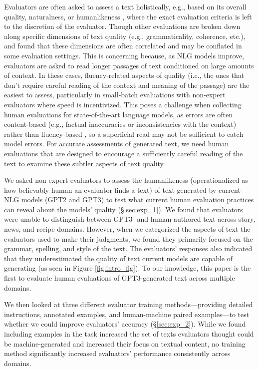 Evaluators are often asked to assess a text holistically, e.g., based on its overall quality, naturalness, or humanlikeness \citep{vanderlee_journal, howcroft-etal-2020-twenty}, 
where the exact evaluation criteria is left to the discretion of the evaluator.
Though other evaluations are broken down along specific dimensions of text quality (e.g., grammaticality, coherence, etc.), \citet{novikova-etal-2017-need,novikova-etal-2018-rankme} and \citet{callison-burch-etal-2007-meta} found that these dimensions are often correlated and may be conflated in some evaluation settings.
This is concerning because, as NLG models improve, evaluators are asked to read longer passages of text conditioned on large amounts of context. In these cases, fluency-related aspects of quality (i.e., the ones that don't require careful reading of the context and meaning of the passage) are the easiest to assess, particularly in small-batch evaluations with non-expert evaluators where speed is incentivized.
This poses a challenge when collecting human evaluations for state-of-the-art language models, as errors are often content-based (e.g., factual inaccuracies or inconsistencies with the context) rather than fluency-based \citep{gpt3}, so a superficial read may not be sufficient to catch model errors.
For accurate assessments of generated text, we need human evaluations that are designed to encourage a sufficiently careful reading of the text to examine these subtler aspects of text quality.

We asked non-expert evaluators to assess the humanlikeness (operationalized as how believably human an evaluator finds a text) of text generated by current NLG models (GPT2 and GPT3) to test what current human evaluation practices can reveal about the models' quality (\S\ref{sec:exp_1}).
We found that evaluators were unable to distinguish between GPT3- and human-authored text across story, news, and recipe domains.
However, when we categorized the aspects of text the evaluators used to make their judgments, we found they primarily focused on the grammar, spelling, and style of the text.
The evaluators' responses also indicated that they underestimated the quality of text current models are capable of generating (as seen in Figure \ref{fig:intro_fig}).
To our knowledge, this paper is the first to evaluate human evaluations of GPT3-generated text across multiple domains.

We then looked at three different evaluator training methods---providing detailed instructions, annotated examples, and human-machine paired examples---to test whether we could improve evaluators' accuracy (\S\ref{sec:exp_2}). While we found including examples in the task increased the set of texts evaluators thought could be machine-generated and increased their focus on textual content, no training method significantly increased evaluators' performance consistently across domains.


